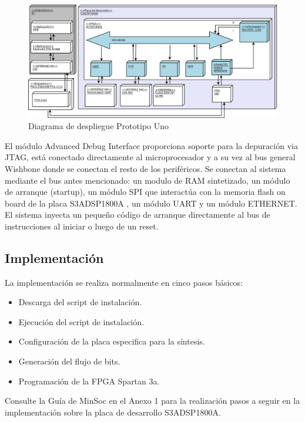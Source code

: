 		\begin{figure}[!h]
 		\begin{center}
  		\includegraphics[width=1\textwidth,keepaspectratio=true]{./images/proto1}
  		\caption{Diagrama de despliegue Prototipo Uno}
  		\label{fig:minsoc}
 		\end{center}
		\end{figure}
		
		El módulo Advanced Debug Interface proporciona soporte para la depuración via JTAG, está conectado directamente al microprocesador y a su vez al bus
		general Wishbone donde se conectan el resto de los periféricos. Se conectan al sistema mediante el bus antes mencionado: un modulo	de RAM
		sintetizado, un módulo de arranque (startup), un módulo SPI que interactúa con la memoria flash on board de la placa S3ADSP1800A , un módulo UART y
		un módulo ETHERNET. El sistema inyecta un pequeño código de arranque directamente al bus de instrucciones al iniciar o luego de un reset. 

\newpage
			
		\subsection{Implementación}

La implementación se realiza normalmente en cinco pasos básicos: 
\begin {itemize}
\item Descarga del script de instalación.
\item Ejecución del script de instalación.
\item Configuración de la placa especifica para la síntesis.
\item Generación del flujo de bits.
\item Programación de la FPGA Spartan 3a.
 \end {itemize}
 Consulte la Guía de MinSoc en el Anexo 1 para la realización pasos a seguir en la implementación sobre la placa de desarrollo  S3ADSP1800A.
		
